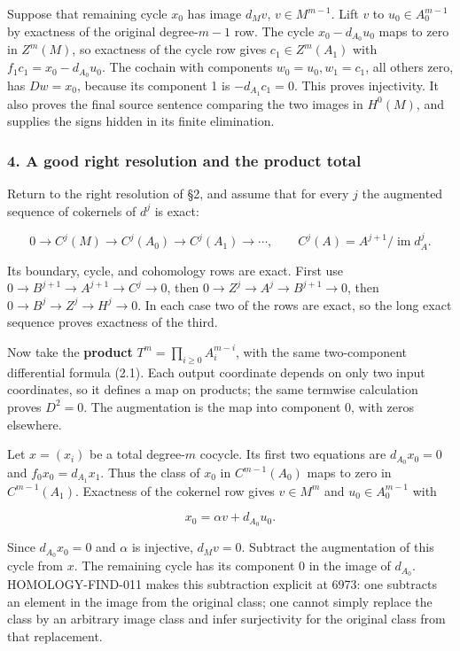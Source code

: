 Suppose that remaining cycle \(x_0\) has image \(d_Mv\), \(v\in M^{m-1}\). Lift \(v\) to \(u_0\in A_0^{m-1}\) by exactness of the original degree-\(m-1\) row. The cycle \(x_0-d_{A_0}u_0\) maps to zero in \(Z^m(M)\), so exactness of the cycle row gives \(c_1\in Z^m(A_1)\) with \(f_1c_1=x_0-d_{A_0}u_0\). The cochain with components \(w_0=u_0,w_1=c_1\), all others zero, has \(Dw=x_0\), because its component 1 is \(-d_{A_1}c_1=0\). This proves injectivity. It also proves the final source sentence comparing the two images in \(H^0(M)\), and supplies the signs hidden in its finite elimination.

\subsubsection{4. A good right resolution and the product total}\label{a-good-right-resolution-and-the-product-total}

Return to the right resolution of §2, and assume that for every \(j\) the augmented sequence of cokernels of \(d^j\) is exact:

\[
0\to C^j(M)\to C^j(A_0)\to C^j(A_1)\to\cdots,
\qquad C^j(A)=A^{j+1}/\operatorname{im}d_A^j.
\]

Its boundary, cycle, and cohomology rows are exact. First use \(0\to B^{j+1}\to A^{j+1}\to C^j\to0\), then \(0\to Z^j\to A^j\to B^{j+1}\to0\), then \(0\to B^j\to Z^j\to H^j\to0\). In each case two of the rows are exact, so the long exact sequence proves exactness of the third.

Now take the \textbf{product} \(T^m=\prod_{i\geq0}A_i^{m-i}\), with the same two-component differential formula (2.1). Each output coordinate depends on only two input coordinates, so it defines a map on products; the same termwise calculation proves \(D^2=0\). The augmentation is the map into component 0, with zeros elsewhere.

Let \(x=(x_i)\) be a total degree-\(m\) cocycle. Its first two equations are \(d_{A_0}x_0=0\) and \(f_0x_0=d_{A_1}x_1\). Thus the class of \(x_0\) in \(C^{m-1}(A_0)\) maps to zero in \(C^{m-1}(A_1)\). Exactness of the cokernel row gives \(v\in M^m\) and \(u_0\in A_0^{m-1}\) with

\[
x_0=\alpha v+d_{A_0}u_0.
\]

Since \(d_{A_0}x_0=0\) and \(\alpha\) is injective, \(d_Mv=0\). Subtract the augmentation of this cycle from \(x\). The remaining cycle has its component 0 in the image of \(d_{A_0}\). HOMOLOGY-FIND-011 makes this subtraction explicit at 6973: one subtracts an element in the image from the original class; one cannot simply replace the class by an arbitrary image class and infer surjectivity for the original class from that replacement.

